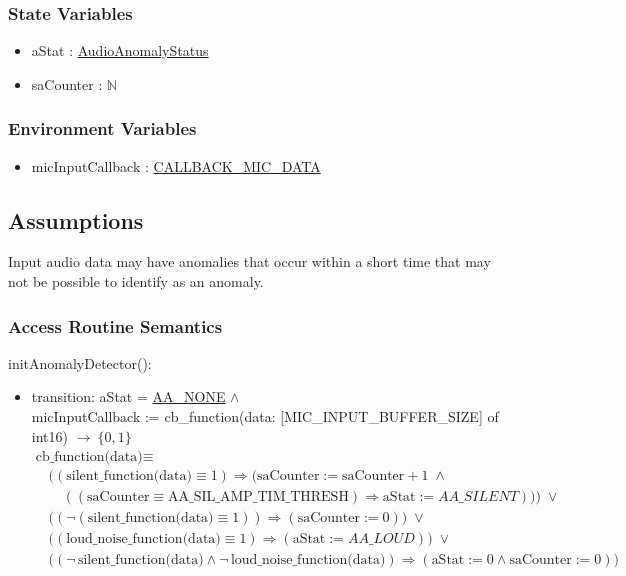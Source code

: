 \documentclass[12pt, titlepage]{article}
\begin{document}
\subsubsection{State Variables}
\begin{itemize}
  \item aStat : \hyperref[enum:AudioAnomalyStatus]{AudioAnomalyStatus}
  \item saCounter : \(\mathbb{N}\)
\end{itemize}

\subsubsection{Environment Variables}
\begin{itemize}
  \item micInputCallback : \hyperref[ds:cb-mic-data]{CALLBACK\_MIC\_DATA}
\end{itemize}

\subsection{Assumptions}

Input audio data may have anomalies that occur within a short time that may
not be possible to identify as an anomaly.

\subsubsection{Access Routine Semantics}
\noindent initAnomalyDetector():

\begin{itemize}
  \item transition: aStat = \hyperref[enum:AudioAnomalyStatus:None]{AA\_NONE}
     \(\wedge\)\\ 
  
    micInputCallback := cb\_function(data: [MIC\_INPUT\_BUFFER\_SIZE] of int16)
    \(\rightarrow\ \{0, 1\}\)\\
    \(\text{cb\_function(data)} \equiv\)
    \[
\begin{alignedat}{2}
&
\Big(
   (\text{silent\_function(data)} \equiv 1)
   \Rightarrow
   \Big(
      \text{saCounter} := \text{saCounter} + 1
      \;\wedge\allowbreak\\[-2pt]
   &\quad
      ((\text{saCounter} \equiv \text{AA\_SIL\_AMP\_TIM\_THRESH})
         \Rightarrow
         \text{aStat} := \hyperref[enum:AudioAnomalyStatus:Silent]{AA\_SILENT})
   \Big)
\Big)
\;\vee\allowbreak\\[4pt]
&\Big(
   (\neg(\text{silent\_function(data)} \equiv 1))
   \Rightarrow
   (\text{saCounter} := 0)
\Big)
\;\vee\allowbreak\\[4pt]
&\Big(
   (\text{loud\_noise\_function(data)} \equiv 1)
   \Rightarrow
   (\text{aStat} := \hyperref[enum:AudioAnomalyStatus:Loud]{AA\_LOUD})
\Big)
\;\vee\allowbreak\\[4pt]
&\Big(
   (\neg\,\text{silent\_function(data)} \wedge
    \neg\,\text{loud\_noise\_function(data)})
   \Rightarrow
   (\text{aStat} := 0 \wedge
    \text{saCounter} := 0)
\Big)
\end{alignedat}
\]

\end{itemize}
\end{document}
